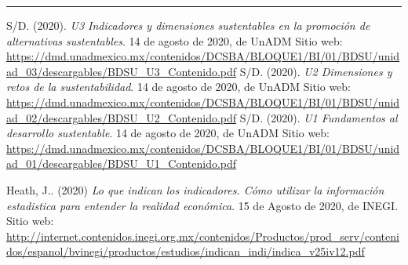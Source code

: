 \documentclass[12pt]{article}
\begin{document}
\hrule
\begin{thebibliography}{X}
	
	 S/D. (2020). \emph{U3 \textbar{} Indicadores y dimensiones sustentables en la promoción de alternativas sustentables}. 14 de agosto de 2020, de UnADM Sitio web: \\\url{https://dmd.unadmexico.mx/contenidos/DCSBA/BLOQUE1/BI/01/BDSU/unidad_03/descargables/BDSU_U3_Contenido.pdf}
	 S/D. (2020). \emph{U2 \textbar{} Dimensiones y retos de la sustentabilidad}. 14 de agosto de 2020, de UnADM Sitio web: \\\url{https://dmd.unadmexico.mx/contenidos/DCSBA/BLOQUE1/BI/01/BDSU/unidad_02/descargables/BDSU_U2_Contenido.pdf}
	 S/D. (2020). \emph{U1 \textbar{} Fundamentos al desarrollo sustentable}. 14 de agosto de 2020, de UnADM Sitio web: \\\url{https://dmd.unadmexico.mx/contenidos/DCSBA/BLOQUE1/BI/01/BDSU/unidad_01/descargables/BDSU_U1_Contenido.pdf}
	
	 Heath, J.. (2020) \emph{Lo que indican los indicadores. C\'omo utilizar la informaci\'on estadistica para entender la realidad econ\'omica}. 15 de Agosto de 2020, de INEGI. Sitio web: \url{http://internet.contenidos.inegi.org.mx/contenidos/Productos/prod_serv/contenidos/espanol/bvinegi/productos/estudios/indican_indi/indica_v25iv12.pdf}
	
\end{thebibliography}
\end{document}
